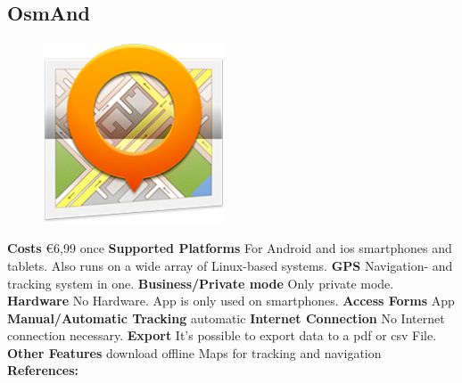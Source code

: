 \begin{singlespace}
\section{OsmAnd} 
\begin{figure}
\centering
\includegraphics[width=0.48\textwidth]{bilder/osmand.png}
\end{figure}



\textbf{Costs} \euro 6,99 once\newline\newline
\textbf{Supported Platforms} For Android and \gls{ios} smartphones and tablets. Also runs on a wide array of Linux-based systems.\newline\newline
\textbf{GPS} Navigation- and tracking  system in one.\newline\newline
\textbf{Business/Private mode} Only private mode.\newline\newline
\textbf{Hardware} No Hardware. App is only used on smartphones.\newline\newline
\textbf{Access Forms} App\newline\newline
\textbf{Manual/Automatic Tracking} automatic\newline\newline
\textbf{Internet Connection} No Internet connection necessary.\newline\newline
\textbf{Export} It’s possible to export data to a \gls{pdf} or \gls{csv} File.\newline\newline
\textbf{Other Features} download offline Maps for tracking and navigation\newline\newline
\textbf{References:} \cite{osmand}
\newpage
\clearpageauthor

\end{singlespace}
